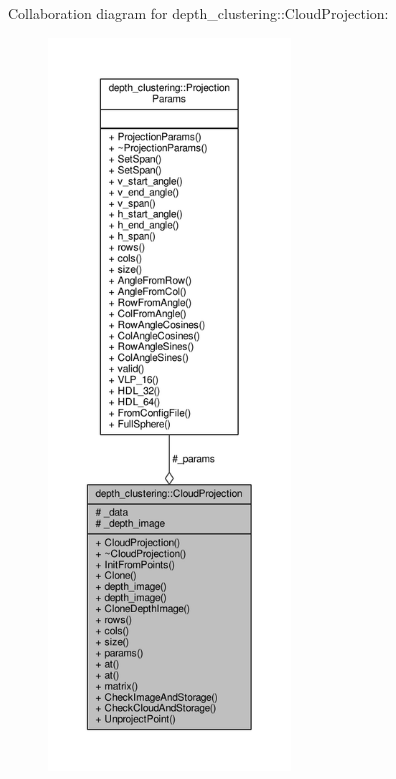 Collaboration diagram for depth\-\_\-clustering\-:\-:Cloud\-Projection\-:
\nopagebreak
\begin{figure}[H]
\begin{center}
\leavevmode
\includegraphics[height=550pt]{classdepth__clustering_1_1CloudProjection__coll__graph}
\end{center}
\end{figure}



